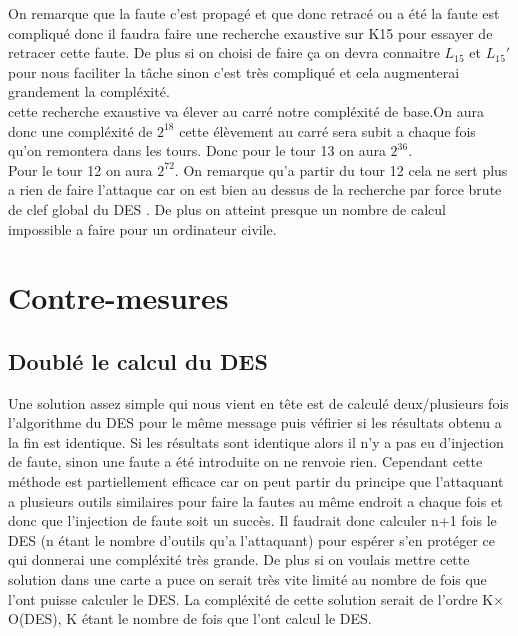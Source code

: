 \documentclass[a4paper]{report}
\begin{document}
			On remarque que la faute c'est propagé et que donc retracé ou a été la faute est compliqué donc il faudra faire une recherche exaustive sur K15 pour essayer de retracer cette faute. De plus si on choisi de faire ça on devra connaitre $L_15$ et $L_15'$ pour nous faciliter la tâche sinon c'est très compliqué et cela augmenterai grandement la compléxité.\\ 
			cette recherche exaustive va élever au carré notre compléxité de base.On aura donc une compléxité de $2^{18}$
			cette élèvement au carré sera subit a chaque fois qu'on remontera dans les tours.
			Donc pour le tour 13 on aura $2^{36}$.\\
			Pour le tour 12 on aura $2^{72}$. On remarque qu'a partir du tour 12 cela ne sert plus a rien de faire l'attaque car on est bien au dessus de la recherche par force brute de clef global du DES . De plus on atteint presque un nombre de calcul impossible a faire pour un ordinateur civile. 
		
		\chapter{Contre-mesures}
			\section{Doublé le calcul du DES}
				Une solution assez simple qui nous vient en tête est de calculé deux/plusieurs fois l'algorithme du DES pour le même message puis véfirier si les résultats obtenu a la fin est
				identique.
				Si les résultats sont identique alors il n'y a pas eu d'injection de faute, sinon une faute a été introduite on ne renvoie rien.
				Cependant cette méthode est partiellement efficace car on peut partir du principe que l'attaquant a plusieurs outils similaires pour faire la fautes au même endroit a chaque fois et 
				donc que l'injection de faute soit un succès. 
				Il faudrait donc calculer n+1 fois le DES (n étant le nombre d'outils qu'a l'attaquant) pour espérer s'en protéger ce qui donnerai une compléxité très grande. 
				De plus si on voulais mettre cette solution dans une carte a puce on serait très vite limité au nombre de fois que l'ont puisse calculer le DES.
				La compléxité de cette solution serait de l'ordre K$\times$O(DES), K étant le nombre de fois que l'ont calcul le DES.
			
\end{document}
